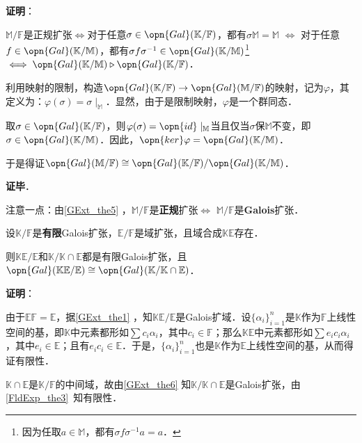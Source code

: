 \textbf{证明}：

$\mathbb{M}/\mathbb{F}$是正规扩张$\iff$对于任意$\sigma\in\opn{Gal}(\mathbb{K}/\mathbb{F})$，都有$\sigma\mathbb{M}=\mathbb{M}$ $\iff$ 对于任意$f\in\opn{Gal}(\mathbb{K}/\mathbb{M})$，都有$\sigma f \sigma^{-1}\in\opn{Gal}(\mathbb{K}/\mathbb{M})$\footnote{因为任取$a\in\mathbb{M}$，都有$\sigma f \sigma^{-1} a=a$．} $\iff\opn{Gal}(\mathbb{K/\mathbb{M}})\triangleright\opn{Gal}(\mathbb{K/\mathbb{F}})$．

利用映射的限制，构造$\opn{Gal}(\mathbb{K}/\mathbb{F})\to\opn{Gal}(\mathbb{M}/\mathbb{F})$的映射，记为$\varphi$，其定义为：$\varphi(\sigma) = \sigma\mid_{\mathbb{M}}$．显然，由于是限制映射，$\varphi$是一个群同态．

取$\sigma\in\opn{Gal}(\mathbb{K}/\mathbb{F})$，则$\varphi(\sigma)=\opn{id}\mid_{\mathbb{M}}$当且仅当$\sigma$保$\mathbb{M}$不变，即$\sigma\in\opn{Gal}(\mathbb{K}/\mathbb{M})$．因此，$\opn{ker}\varphi=\opn{Gal}(\mathbb{K}/\mathbb{M})$．

于是得证$\opn{Gal}(\mathbb{M}/\mathbb{F})\cong \opn{Gal}(\mathbb{K}/\mathbb{F})/\opn{Gal}(\mathbb{K}/\mathbb{M})$．


\textbf{证毕}．


注意一点：由\autoref{GExt_the5} ，$\mathbb{M}/\mathbb{F}$是\textbf{正规}扩张$\iff$ $\mathbb{M}/\mathbb{F}$是\textbf{Galois}扩张．





\begin{theorem}{}
设$\mathbb{K}/\mathbb{F}$是\textbf{有限}Galois扩张，$\mathbb{E}/\mathbb{F}$是域扩张，且域合成$\mathbb{KE}$存在．

则$\mathbb{KE}/\mathbb{E}$和$\mathbb{K}/\mathbb{K}\cap\mathbb{E}$都是有限Galois扩张，且$\opn{Gal}(\mathbb{KE}/\mathbb{E})\cong\opn{Gal}(\mathbb{K}/\mathbb{K}\cap\mathbb{E})$．
\end{theorem}

\textbf{证明}：

由于$\mathbb{E}\mathbb{F}=\mathbb{E}$，据\autoref{GExt_the1} ，知$\mathbb{KE}/\mathbb{E}$是Galois扩域．设$\{\alpha_i\}_{i=1}^n$是$\mathbb{K}$作为$\mathbb{F}$上线性空间的基，即$\mathbb{K}$中元素都形如$\sum c_i\alpha_i$，其中$c_i\in\mathbb{F}$；那么$\mathbb{KE}$中元素都形如$\sum e_ic_i\alpha_i$，其中$e_i\in\mathbb{E}$；且有$e_ic_i\in\mathbb{E}$．于是，$\{\alpha_i\}_{i=1}^n$也是$\mathbb{K}$作为$\mathbb{E}$上线性空间的基，从而得证有限性．

$\mathbb{K}\cap\mathbb{E}$是$\mathbb{K}/\mathbb{F}$的中间域，故由\autoref{GExt_the6} 知$\mathbb{K}/\mathbb{K}\cap\mathbb{E}$是Galois扩张，由\autoref{FldExp_the3}~知有限性．

